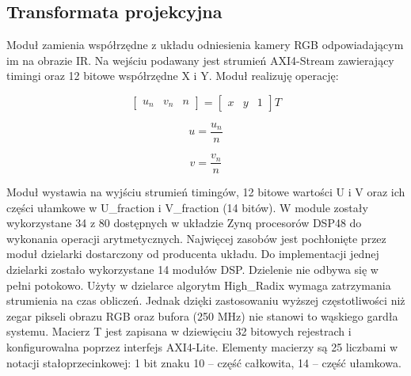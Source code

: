 
\subsection{Transformata projekcyjna}

Moduł zamienia współrzędne z układu odniesienia kamery RGB odpowiadającym im na obrazie IR. %
Na wejściu podawany jest strumień AXI4-Stream zawierający timingi oraz 12 bitowe współrzędne X i Y. %
Moduł realizuję operację: 

\begin{equation}
\begin{bmatrix}
u_n & v_n & n
\end{bmatrix} 
= 
\begin{bmatrix}
x & y & 1
\end{bmatrix}
T
\end{equation}

\begin{equation}
u = \frac{u_n}{n}
\end{equation}

\begin{equation}
v = \frac{v_n}{n}
\end{equation}


Moduł wystawia na wyjściu strumień timingów, 12 bitowe wartości U i V oraz ich części ułamkowe w U\_fraction i V\_fraction (14 bitów). %
W module zostały wykorzystane 34 z 80 dostępnych w układzie Zynq procesorów DSP48 do wykonania operacji arytmetycznych. %
Najwięcej zasobów jest pochłonięte przez moduł dzielarki dostarczony od producenta układu. %
Do implementacji jednej dzielarki zostało wykorzystane 14 modułów DSP. %
Dzielenie nie odbywa się w pełni potokowo. 
Użyty w dzielarce algorytm High\_Radix wymaga zatrzymania strumienia na czas obliczeń. 
Jednak dzięki zastosowaniu wyższej częstotliwości niż zegar pikseli obrazu RGB oraz bufora (250 MHz) nie stanowi to wąskiego gardła systemu. %
Macierz T jest zapisana  w dziewięciu 32 bitowych rejestrach i konfigurowalna poprzez interfejs AXI4-Lite. 
Elementy macierzy są 25 liczbami w notacji stałoprzecinkowej: 1 bit znaku 10 – część całkowita, 14 – część ułamkowa.

